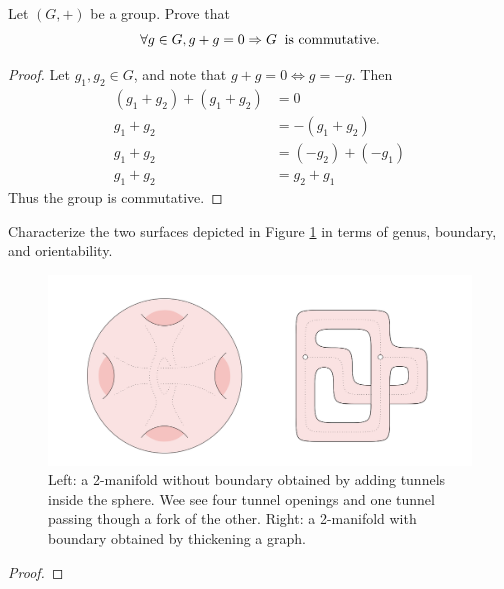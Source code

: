 \documentclass[12pt]{article}
\newenvironment{statement}[2][Statement]{\begin{trivlist}
\item[\hskip \labelsep {\bfseries #1}\hskip \labelsep {\bfseries #2.}]}{\end{trivlist}}
\begin{document}
\begin{statement}[Problem]{3}
Let $(G,+)$ be a group. Prove that
    $$ \forall g \in G, g+g = 0 \Rightarrow G \hspace{0.2cm} \text{is commutative}.$$
\end{statement}
\begin{proof}
  Let $g_1,g_2 \in G$, and note that $g+g=0 \iff g=-g$. Then 
  \begin{align*}
    (g_1 + g_2) + (g_1 + g_2) &=  0 \\
    g_1 + g_2 & = -(g_1 + g_2) \\
    g_1 + g_2 &= (-g_2) + (-g_1) \\
    g_1 + g_2 &= g_2 + g_1
  \end{align*}
  Thus the group is commutative.
\end{proof}

\begin{statement}[Problem]{4}
 Characterize the two surfaces depicted in Figure \ref{fig:surfaces}  in terms of genus, boundary, and orientability.

    \begin{figure}[ht]
        \centering
        \includegraphics[width=0.5\linewidth]{surfaces.png}
        \caption{Left: a 2-manifold without boundary obtained by adding tunnels inside the sphere. Wee see four tunnel openings and one tunnel passing though a fork of the other. Right: a 2-manifold with boundary obtained by thickening a graph.}
        \label{fig:surfaces}
    \end{figure}
\end{statement}
\begin{proof}

\end{proof}
\end{document}

